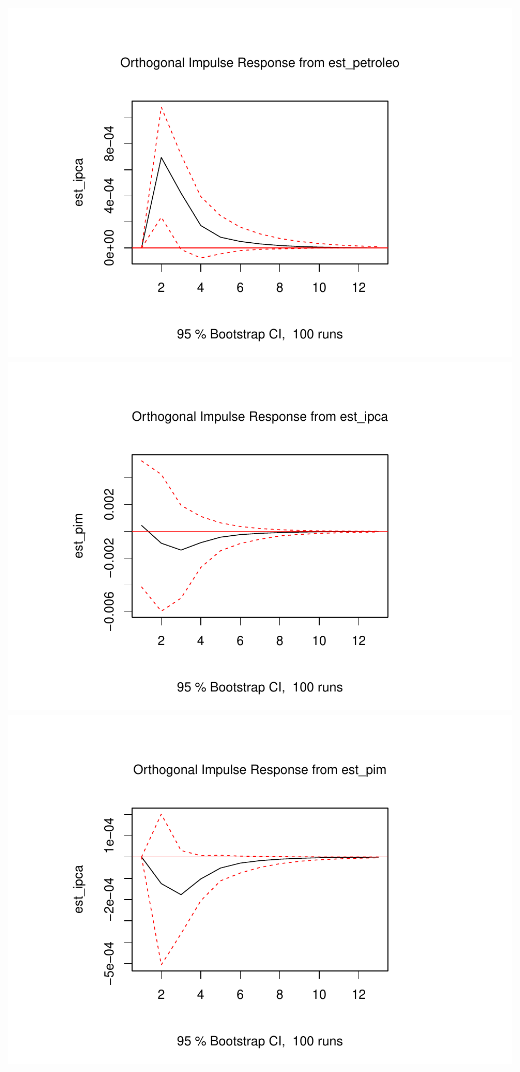 \documentclass[12pt]{article}
\begin{document}
\includegraphics{artigo_files/figure-latex/unnamed-chunk-14-4.pdf}
\includegraphics{artigo_files/figure-latex/unnamed-chunk-14-5.pdf}
\includegraphics{artigo_files/figure-latex/unnamed-chunk-14-6.pdf}
\end{document}
